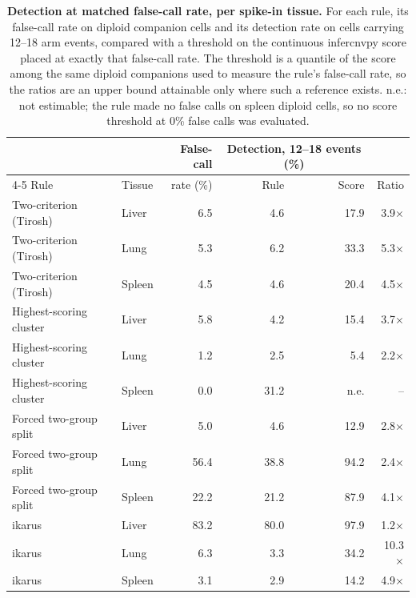 \begin{table}[htbp]
\centering
\caption{\textbf{Detection at matched false-call rate, per spike-in tissue.} For each rule, its false-call rate on diploid companion cells and its detection rate on cells carrying 12--18 arm events, compared with a threshold on the continuous infercnvpy score placed at exactly that false-call rate. The threshold is a quantile of the score among the same diploid companions used to measure the rule's false-call rate, so the ratios are an upper bound attainable only where such a reference exists. n.e.: not estimable; the rule made no false calls on spleen diploid cells, so no score threshold at 0\% false calls was evaluated.}
\label{tab:matched}
\small
\begin{tabular}{@{}llrrrr@{}}
\toprule
 & & False-call & \multicolumn{2}{c}{Detection, 12--18 events (\%)} & \\
\cmidrule(lr){4-5}
Rule & Tissue & rate (\%) & Rule & Score & Ratio \\
\midrule
Two-criterion (Tirosh) & Liver & 6.5 & 4.6 & 17.9 & 3.9$\times$ \\
Two-criterion (Tirosh) & Lung & 5.3 & 6.2 & 33.3 & 5.3$\times$ \\
Two-criterion (Tirosh) & Spleen & 4.5 & 4.6 & 20.4 & 4.5$\times$ \\
\addlinespace
Highest-scoring cluster & Liver & 5.8 & 4.2 & 15.4 & 3.7$\times$ \\
Highest-scoring cluster & Lung & 1.2 & 2.5 & 5.4 & 2.2$\times$ \\
Highest-scoring cluster & Spleen & 0.0 & 31.2 & n.e. & -- \\
\addlinespace
Forced two-group split & Liver & 5.0 & 4.6 & 12.9 & 2.8$\times$ \\
Forced two-group split & Lung & 56.4 & 38.8 & 94.2 & 2.4$\times$ \\
Forced two-group split & Spleen & 22.2 & 21.2 & 87.9 & 4.1$\times$ \\
\addlinespace
ikarus & Liver & 83.2 & 80.0 & 97.9 & 1.2$\times$ \\
ikarus & Lung & 6.3 & 3.3 & 34.2 & 10.3$\times$ \\
ikarus & Spleen & 3.1 & 2.9 & 14.2 & 4.9$\times$ \\
\bottomrule
\end{tabular}
\end{table}
